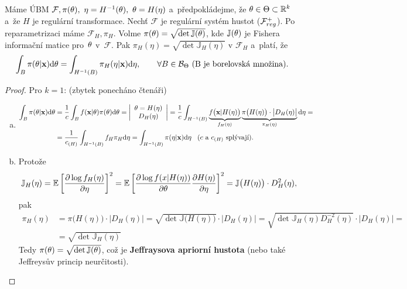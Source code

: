\begin{theorem}[Jeffreys]
	Máme ÚBM $\mathcal{F},\pi(\theta),~\eta=H^{-1}(\theta),~\theta=H(\eta)$ a~předpokládejme, že $\theta\in\Theta\subset\mathbb{R}^k$ a~že $H$ je regulární transformace. Nechť $\mathcal{F}$ je regulární systém hustot ($\mathcal{F}_{reg}^+$). Po reparametrizaci máme $\mathcal{F}_H,\pi_H$. Volme $\pi(\theta)=\sqrt{\det \mathbb{J}(\theta)}$, kde $\mathbb{J}(\theta)$ je Fishera informační matice pro~$\theta$ v~$\mathcal{F}$. Pak $\pi_H(\eta)=\sqrt{\det \mathbb{J}_H(\eta)}$ v $\mathcal{F}_H$ a~platí, že 
	$$ \int_B\pi(\theta|\textbf{x})\mathrm{d}\theta=\int_{H^{-1}(B)}\pi_H(\eta|\textbf{x})\mathrm{d}\eta,\qquad\forall B\in\mathcal{B}_\Theta \text{ (B je borelovská množina).}$$
	\begin{proof}
		Pro $k=1$: (zbytek ponecháno čtenáři)\begin{enumerate}[a)]
			\item \[
			\begin{split}
			\int_B\pi(\theta|\textbf{x})\mathrm{d}\theta&=\frac{1}{c}\int_B f(\textbf{x}|\theta)\pi(\theta)\mathrm{d}\theta=\left|\begin{array}{c}
			\theta=H(\eta)\\D_H(\eta)
			\end{array}
			\right|=\frac{1}{c}\int_{H^{-1}(B)}\underbrace{f\big(\textbf{x}|H(\eta)\big)}_{f_H(\eta)}\underbrace{\pi\big(H(\eta)\big)\cdot\big|D_H(\eta)\big|}_{\pi_H(\eta)}\mathrm{d}\eta=\\&=\frac{1}{c_{(H)}}\int_{H^{-1}(B)}f_H\pi_H\mathrm{d}\eta=\int_{H^{-1}(B)}\pi(\eta|\textbf{x})\mathrm{d}\eta \hspace{0.3cm} (c \text{ a } c_{(H)} \text{ splývají}).
			\end{split}
			\]
			\item Protože 
			$$ \mathbb{J}_H(\eta)=\mathbb{E}\left[ \frac{\partial\log f_H(\eta)}{\partial\eta} \right]^2=\mathbb{E}\left[ \frac{\partial\log f(x|H(\eta))}{\partial\theta}\frac{\partial H(\eta)}{\partial\eta} \right]^2=\mathbb{J}\big(H(\eta)\big) \cdot D_H^2(\eta) ,$$
			pak \[
			\begin{split}
			\pi_H(\eta)&=\pi\big(H(\eta)\big)\cdot\big|D_H(\eta)\big|=\sqrt{\det \mathbb{J}\big(H(\eta)\big)}\cdot\big|D_H(\eta)\big|=\sqrt{\det \mathbb{J}_H(\eta)D_H^{-2}(\eta)}\cdot\big|D_H(\eta)\big|=\\&=\sqrt{\det \mathbb{J}_H(\eta)}
			\end{split}
			\]
			Tedy $\pi(\theta)=\sqrt{\det \mathbb{J}(\theta)}$, což je \textbf{Jeffraysova apriorní hustota} (nebo také Jeffreysův princip neurčitosti).
		\end{enumerate}
	\end{proof}
\end{theorem}
